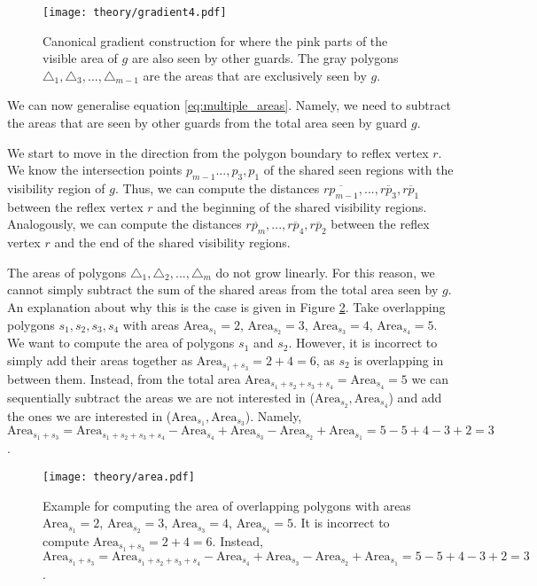 \begin{figure}[h!]
    \centering
    \texttt{[image: theory/gradient4.pdf]}
    \caption{Canonical gradient construction for where the pink parts of the visible area of $g$ are also seen by other guards. The gray polygons $\triangle_1, \triangle_3, ..., \triangle_{m - 1}$ are the areas that are exclusively seen by $g$.}
    \label{fig:general_gradient} 
\end{figure}

We can now generalise equation \ref{eq:multiple_areas}. Namely, we need to subtract the areas that are seen by other guards from the total area seen by guard $g$. 

We start to move in the direction from the polygon boundary to reflex vertex $r$. We know the intersection points $p_{m - 1} ..., p_3, p_1$ of the shared seen regions with the visibility region of $g$. Thus, we can compute the distances $\overline{rp_{m - 1}}, ..., \overline{rp_3}, \overline{rp_1}$ between the reflex vertex $r$ and the beginning of the shared visibility regions. Analogously, we can compute the distances $\overline{rp_m}, ...,  \overline{rp_4}, \overline{rp_2}$ between the reflex vertex $r$ and the end of the shared visibility regions.

The areas of polygons $\triangle_1, \triangle_2, ..., \triangle_m$ do not grow linearly. For this reason, we cannot simply subtract the sum of the shared areas from the total area seen by $g$. An explanation about why this is the case is given in Figure \ref{fig:areas}. Take overlapping polygons $s_1, s_2, s_3, s_4$ with areas $\text{Area}_{s_1} = 2$, $\text{Area}_{s_2} = 3$, $\text{Area}_{s_3} = 4$, $\text{Area}_{s_4} = 5$. We want to compute the area of polygons $s_1$ and $s_2$. However, it is incorrect to simply add their areas together as $\text{Area}_{s_1 + s_3} = 2 + 4 = 6$, as $s_2$ is overlapping in between them. Instead, from the total area $\text{Area}_{s_1 + s_2 + s_3 + s_4} = \text{Area}_{s_4} = 5$ we can sequentially subtract the areas we are not interested in ($\text{Area}_{s_2}, \text{Area}_{s_4}$) and add the ones we are interested in ($\text{Area}_{s_1}, \text{Area}_{s_3}$). Namely, $\text{Area}_{s_1 + s_3} = \text{Area}_{s_1 + s_2 + s_3 + s_4} - \text{Area}_{s_4} + \text{Area}_{s_3} - \text{Area}_{s_2} + \text{Area}_{s_1} = 5 - 5 + 4 - 3 + 2 = 3$.

\begin{figure}[h!]
    \centering
    \texttt{[image: theory/area.pdf]}
    \caption{Example for computing the area of overlapping polygons with areas $\text{Area}_{s_1} = 2$, $\text{Area}_{s_2} = 3$, $\text{Area}_{s_3} = 4$, $\text{Area}_{s_4} = 5$. It is incorrect to compute $\text{Area}_{s_1 + s_3} = 2 + 4 = 6$. Instead, $\text{Area}_{s_1 + s_3} = \text{Area}_{s_1 + s_2 + s_3 + s_4} - \text{Area}_{s_4} + \text{Area}_{s_3} - \text{Area}_{s_2} + \text{Area}_{s_1} = 5 - 5 + 4 - 3 + 2 = 3$.}
    \label{fig:areas}
\end{figure}


